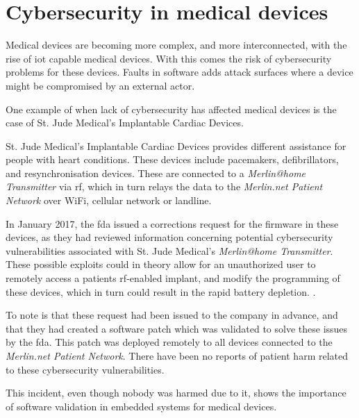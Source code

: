 \section{Cybersecurity in medical devices}

Medical devices are becoming more complex, and more interconnected, with the
rise of \acrfull{iot} capable medical devices. With this comes the risk of
cybersecurity problems for these devices. Faults in software adds attack
surfaces where a device might be compromised by an external actor.

One example of when lack of cybersecurity has affected medical devices is the
case of St. Jude Medical's Implantable Cardiac Devices.

St. Jude Medical's Implantable Cardiac Devices provides different
assistance for people with heart conditions.
These devices include pacemakers,
defibrillators, and resynchronisation devices. 
These are connected to a \textit{Merlin@home Transmitter} via
\acrshort{rf}, which in turn relays the data to the  
\textit{Merlin.net Patient Network} over WiFi, cellular network or
landline.

In January 2017, the \acrfull{fda} issued a corrections request for
the firmware in these devices, as they had reviewed information
concerning potential cybersecurity vulnerabilities associated with St.
Jude Medical's \textit{Merlin@home Transmitter}. These possible
exploits could in theory allow for an unauthorized user to remotely
access a patients \acrshort{rf}-enabled implant, and modify the
programming of these devices, which in turn could result in the rapid
battery depletion. \cite{fda:stJudesMedicalDevices}.

To note is that these request had been issued to the company in
advance, and that they had created a software patch which was
validated to solve these issues by the \acrshort{fda}. This patch was
deployed remotely to all devices connected to the
\textit{Merlin.net Patient Network}. There have been no reports of
patient harm related to these cybersecurity vulnerabilities.

This incident, even though nobody was harmed due to it, shows the
importance of software validation in embedded systems for medical
devices.


